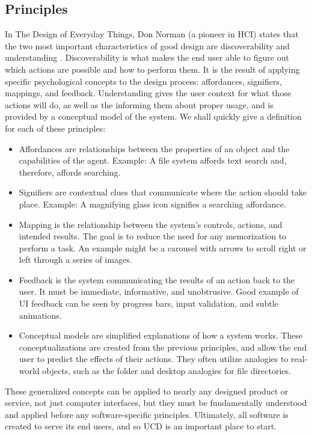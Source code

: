\documentclass[12pt, oneside]{article}
\begin{document}
\subsection{Principles}

In The Design of Everyday Things, Don Norman (a pioneer in HCI) states that the two most important characteristics of good design are discoverability and understanding \cite[p.~3]{norman_2013}. Discoverability is what makes the end user able to figure out which actions are possible and how to perform them. It is the result of applying specific psychological concepts to the design process: affordances, signifiers, mappings, and feedback. Understanding gives the user context for what those actions will do, as well as the informing them about proper usage, and is provided by a conceptual model of the system. We shall quickly give a definition for each of these principles:

\begin{itemize}
\raggedright
    \item Affordances are relationships between the properties of an object and the capabilities of the agent. Example: A file system affords text search and, therefore, affords searching.
    \item Signifiers are contextual clues that communicate where the action should take place. Example: A magnifying glass icon signifies a searching affordance.
    \item Mapping is the relationship between the system's controls, actions, and intended results. The goal is to reduce the need for any memorization to perform a task. An example might be a carousel with arrows to scroll right or left through a series of images.
    \item Feedback is the system communicating the results of an action back to the user. It must be immediate, informative, and unobtrusive. Good example of UI feedback can be seen by progress bars, input validation, and subtle animations.
    \item Conceptual models are simplified explanations of how a system works. These conceptualizations are created from the previous principles, and allow the end user to predict the effects of their actions. They often utilize analogies to real-world objects, such as the folder and desktop analogies for file directories.
\end{itemize}

These generalized concepts can be applied to nearly any designed product or service, not just computer interfaces, but they must be fundamentally understood and applied before any software-specific principles. Ultimately, all software is created to serve its end users, and so UCD is an important place to start.
\end{document}
